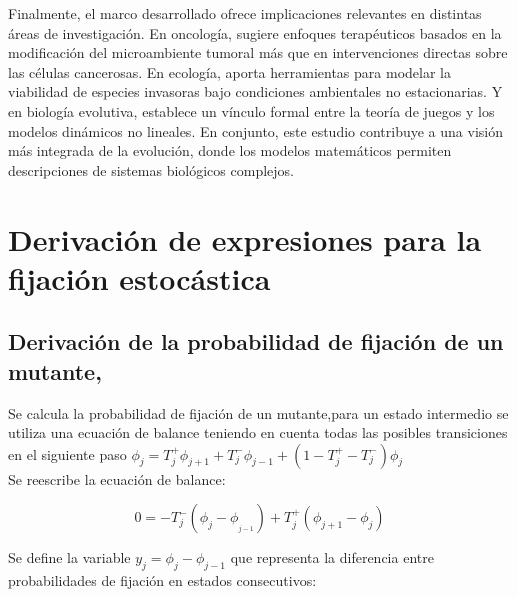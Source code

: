 \documentclass[%
 sor,
 jor,
 amsmath,amssymb,
 reprint,%
]{revtex4-2}
\begin{document}
Finalmente, el marco desarrollado ofrece implicaciones relevantes en distintas áreas de investigación. En oncología, sugiere enfoques terapéuticos basados en la modificación del microambiente tumoral más que en intervenciones directas sobre las células cancerosas. En ecología, aporta herramientas para modelar la viabilidad de especies invasoras bajo condiciones ambientales no estacionarias. Y en biología evolutiva, establece un vínculo formal entre la teoría de juegos y los modelos dinámicos no lineales. En conjunto, este estudio contribuye a una visión más integrada de la evolución, donde los modelos matemáticos permiten descripciones de sistemas biológicos complejos.
 
























\newpage

\renewcommand{\appendixname}{Apéndice}
\appendix
\section{Derivación de expresiones para la fijación estocástica} 
\label{ApendiceA}

\subsection{Derivación de la probabilidad de fijación de un mutante, \cite{Arne}}
\vspace{0,2 cm}

Se calcula la probabilidad de fijación de un mutante,para un estado intermedio se utiliza una ecuación de balance teniendo en cuenta todas las posibles transiciones en el siguiente paso \(\phi_j=T_j^+\phi_{j+1}+T_j^-\phi_{j-1}+(1-T_j^+-T_j^-)\phi_j \)\\

Se reescribe la ecuación de balance:

\[
0=-T_j^-(\phi_j-\phi_{_{j-1}})+T_j^+(\phi_{j+1}-\phi_j)
\]

Se define la variable \(y_j=\phi_{j}-\phi_{j-1}\) que representa la diferencia entre probabilidades de fijación en estados consecutivos:
\end{document}
